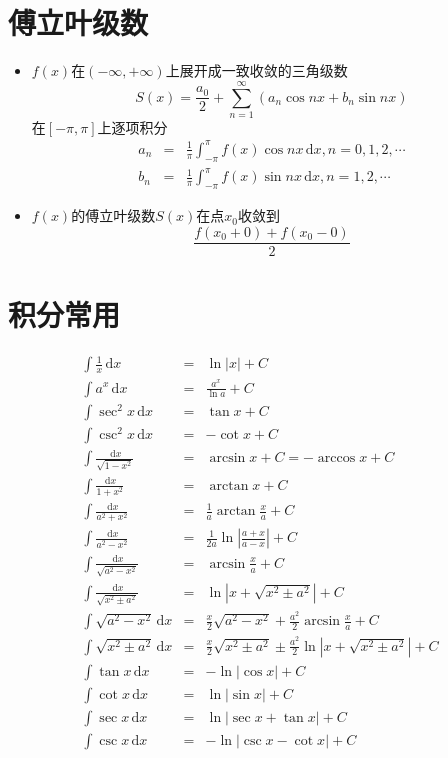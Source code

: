 \documentclass[UTF8]{ctexart}
\newcommand{\ud}{\,\mathrm{d}}
\begin{document}
\section{傅立叶级数}
\begin{itemize}
\item $f(x)$在$(-\infty,+\infty)$上展开成一致收敛的三角级数
\[
	S(x) = \frac{a_0}{2}+\sum_{n=1}^\infty(a_n \cos nx+ b_n \sin nx)
\]
在$[- \pi,\pi]$上逐项积分
\begin{eqnarray*}
a_n &=& \frac{1}{\pi} \int_{-\pi}^{\pi} f(x)\cos nx\ud x, n=0,1,2,\cdots\\
b_n &=& \frac{1}{\pi} \int_{-\pi}^{\pi} f(x)\sin nx\ud x, n=1,2,\cdots
\end{eqnarray*}

\item $f(x)$的傅立叶级数$S(x)$在点$x_0$收敛到
\[
\frac{f(x_0+0)+f(x_0-0)}{2}
\]
\end{itemize}


\section{积分常用}
\begin{eqnarray*}
\int \frac{1}{x}\ud x &=& \ln|x|+C \\
\int a^x \ud x&=&\frac{a^x}{\ln a}+C \\
\int \sec^2 x\ud x &=& \tan x+C \\
\int \csc^2 x\ud x &=& -\cot x+C \\
\int \frac{\ud x}{\sqrt{1-x^2}} &=&\arcsin x+C = -\arccos x+C \\
\int \frac{\ud x}{1+x^2} &=& \arctan x + C \\
\int \frac{\ud x}{a^2+x^2}&=&\frac{1}{a} \arctan\frac{x}{a} +C \\
\int \frac{\ud x}{a^2-x^2}&=&\frac{1}{2a} \ln\left|\frac{a+x}{a-x}\right| +C \\
\int \frac{\ud x}{\sqrt{a^2-x^2}}&=&\arcsin\frac{x}{a} +C \\
\int \frac{\ud x}{\sqrt{x^2\pm a^2}}&=&\ln|x+\sqrt{x^2\pm a^2}| +C \\
\int \sqrt{a^2-x^2}\ud x&=&\frac{x}{2}\sqrt{a^2-x^2}+\frac{a^2}{2}\arcsin\frac{x}{a} +C \\
\int \sqrt{x^2\pm a^2}\ud x&=&\frac{x}{2}\sqrt{x^2\pm a^2}\pm \frac{a^2}{2}\ln|x+\sqrt{x^2\pm a^2}| +C \\
\int \tan x\ud x&=&-\ln|\cos x|+C\\
\int \cot x\ud x&=&\ln|\sin x|+C\\
\int \sec x\ud x&=&\ln|\sec x+\tan x|+C\\
\int \csc x\ud x&=&-\ln|\csc x-\cot x|+C\\
\end{eqnarray*}
\end{document}
